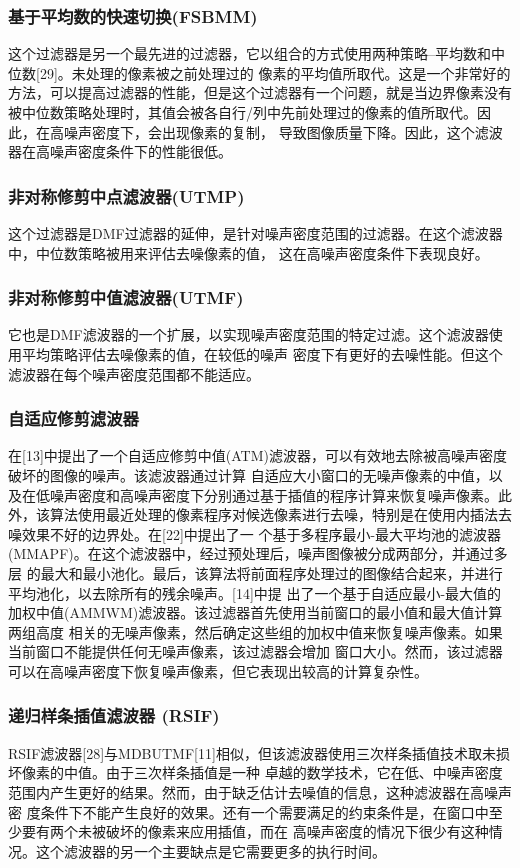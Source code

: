 \documentclass{article} %
\begin{document}
\subsubsection{基于平均数的快速切换(FSBMM)}
这个过滤器是另一个最先进的过滤器，它以组合的方式使用两种策略--平均数和中位数[29]。未处理的像素被之前处理过的
像素的平均值所取代。这是一个非常好的方法，可以提高过滤器的性能，但是这个过滤器有一个问题，就是当边界像素没有
被中位数策略处理时，其值会被各自行/列中先前处理过的像素的值所取代。因此，在高噪声密度下，会出现像素的复制，
导致图像质量下降。因此，这个滤波器在高噪声密度条件下的性能很低。

\subsubsection{非对称修剪中点滤波器(UTMP)}
这个过滤器是DMF过滤器的延伸，是针对噪声密度范围的过滤器。在这个滤波器中，中位数策略被用来评估去噪像素的值，
这在高噪声密度条件下表现良好。

\subsubsection{非对称修剪中值滤波器(UTMF)}
它也是DMF滤波器的一个扩展，以实现噪声密度范围的特定过滤。这个滤波器使用平均策略评估去噪像素的值，在较低的噪声
密度下有更好的去噪性能。但这个滤波器在每个噪声密度范围都不能适应。

\subsubsection{自适应修剪滤波器}
在[13]中提出了一个自适应修剪中值(ATM)滤波器，可以有效地去除被高噪声密度破坏的图像的噪声。该滤波器通过计算
自适应大小窗口的无噪声像素的中值，以及在低噪声密度和高噪声密度下分别通过基于插值的程序计算来恢复噪声像素。此
外，该算法使用最近处理的像素程序对候选像素进行去噪，特别是在使用内插法去噪效果不好的边界处。在[22]中提出了一
个基于多程序最小-最大平均池的滤波器(MMAPF)。在这个滤波器中，经过预处理后，噪声图像被分成两部分，并通过多层
的最大和最小池化。最后，该算法将前面程序处理过的图像结合起来，并进行平均池化，以去除所有的残余噪声。[14]中提
出了一个基于自适应最小-最大值的加权中值(AMMWM)滤波器。该过滤器首先使用当前窗口的最小值和最大值计算两组高度
相关的无噪声像素，然后确定这些组的加权中值来恢复噪声像素。如果当前窗口不能提供任何无噪声像素，该过滤器会增加
窗口大小。然而，该过滤器可以在高噪声密度下恢复噪声像素，但它表现出较高的计算复杂性。

\subsubsection{递归样条插值滤波器 (RSIF)}
RSIF滤波器[28]与MDBUTMF[11]相似，但该滤波器使用三次样条插值技术取未损坏像素的中值。由于三次样条插值是一种
卓越的数学技术，它在低、中噪声密度范围内产生更好的结果。然而，由于缺乏估计去噪值的信息，这种滤波器在高噪声密
度条件下不能产生良好的效果。还有一个需要满足的约束条件是，在窗口中至少要有两个未被破坏的像素来应用插值，而在
高噪声密度的情况下很少有这种情况。这个滤波器的另一个主要缺点是它需要更多的执行时间。
\end{document}
